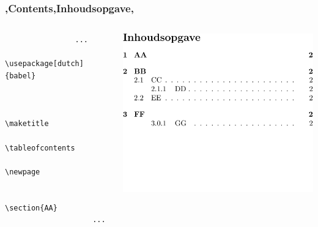 

\begin{frame}[fragile]
    \frametitle{\lang,Contents,Inhoudsopgave,}
    
    \begin{columns}
        \begin{column}{0.5\textwidth}
            \begin{verbatim}
                ...
                \usepackage[dutch]{babel}
                
                
                    \maketitle
                    \tableofcontents
                    \newpage
                    
                    \section{AA}
                    ...
                
            \end{verbatim}
        \end{column}
        \begin{column}{0.5\textwidth}
            \includegraphics[width=\linewidth,height=0.8\textheight,keepaspectratio,page=1]{assets/tableofcontentsdutch.pdf}
        \end{column}
    \end{columns}
\end{frame}

